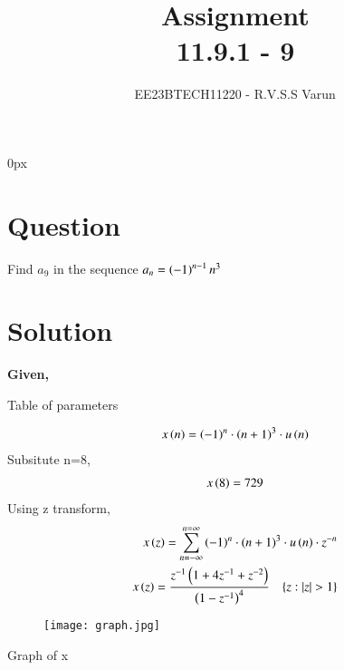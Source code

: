 \documentclass[beamer]{IEEEtran}
\theoremstyle{remark}
\begin{document}
\parindent 0px


\title{Assignment\\[1ex]11.9.1 - 9}
\author{EE23BTECH11220 - R.V.S.S Varun$^{}$%
}
\maketitle
\newpage
\bigskip

\renewcommand{\thefigure}{\theenumi}
\renewcommand{\thetable}{\theenumi}
\section*{Question}
Find $a_{9}$ in the sequence $a_{n}=\left(-1\right)^{n-1}n^{3}$ 
\section*{Solution}
\textbf{Given,} 
\begin{table}[h]
    \centering
    
    \vspace{10pt}
    \caption{Table of parameters}
    \label{tab:my_label}
\end{table}

\begin{align}
x\left(n\right)=\left(-1\right)^{n}\cdot \left(n+1\right)^{3}\cdot u\left(n\right)
\end{align}
Subsitute n=8,
\begin{align}
x\left(8\right)=729
\end{align}
Using  z transform,
\begin{align}
x\brak{z}=\sum_{n=-\infty}^{n=\infty}\brak{-1}^{n}\cdot (n+1)^{3}\cdot u\brak{n}\cdot z^{-n}\\
x\brak{z}=\frac{z^{-1}\brak{1+4z^{-1}+z^{-2}}}{\brak{1-z^{-1}}^{4}}\hspace{10pt}
\{z:|z|>1\}
\end{align} 

\begin{figure}[h]
    \centering
    \texttt{[image: graph.jpg]} 
    \label{fig:enter-label}
\end{figure}
\begin{center}
Graph of x
   \end{center}
\end{document}
